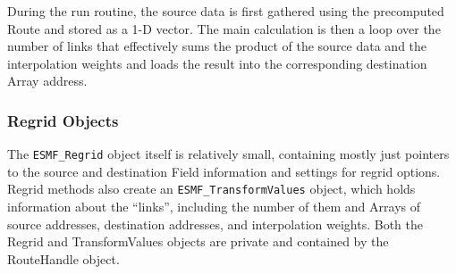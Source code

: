 During the run routine, the source data is first gathered using the
precomputed Route and stored as a 1-D vector.  The main calculation is then 
a loop over the number of links that effectively sums the product of the
source data and the interpolation weights and loads the result into the
corresponding destination Array address.

\subsubsection{Regrid Objects}
The {\tt ESMF\_Regrid} object itself is relatively small, containing mostly
just pointers to the source and destination Field information and settings
for regrid options.  Regrid methods also create an {\tt ESMF\_TransformValues}
object, which holds information about the ``links'', including the number of
them and Arrays of source addresses, destination addresses, and interpolation
weights.  Both the Regrid and TransformValues objects are private and 
contained by the RouteHandle object.

